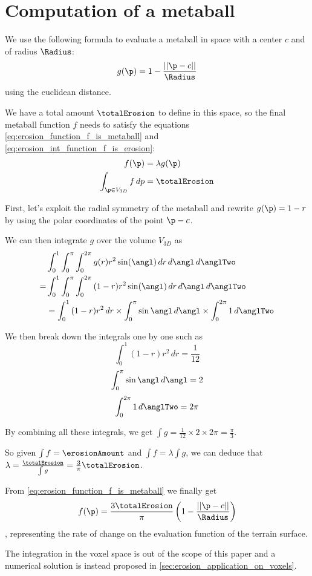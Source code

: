 \chapter{Computation of a metaball}
\label{sec:erosion_appendix_metaball}


We use the following formula to evaluate a metaball in space with a center $c$ and of radius $\Radius$:
$$ g(\p) = 1 - \frac{||\p - c||}{\Radius} $$
using the euclidean distance.

We have a total amount $\totalErosion$ to define in this space, so the final metaball function $f$ needs to satisfy the equations \eqref{eq:erosion_function_f_is_metaball} and \eqref{eq:erosion_int_function_f_is_erosion}:
\begin{align}
\label{eq:erosion_function_f_is_metaball}
f(\p) &= \lambda g(\p) \\
\label{eq:erosion_int_function_f_is_erosion}
\int_{\p \in V_{3D}}{f \, dp} &= \totalErosion
\end{align}

First, let's exploit the radial symmetry of the metaball and rewrite $g(\p) = 1 - r$ by using the polar coordinates of the point $\p - c$.

We can then integrate $g$ over the volume $V_{3D}$ as 
\begin{align}
&\int_{0}^{1}{ \int_{0}^{\pi}{ \int_{0}^{2\pi}{ g(r) r^2 \sin(\angl)\, dr} \, d\angl} \, d\anglTwo} \nonumber \\
= &\int_{0}^{1}{ \int_{0}^{\pi}{ \int_{0}^{2\pi}{ (1 - r) r^2 \sin(\angl)\, dr} \, d\angl} \, d\anglTwo} \nonumber \\
&= \int_{0}^{1}{ (1 - r)r^2 \, dr} \times \int_{0}^{\pi}{ \sin{\angl} \, d\angl } \times \int_{0}^{2\pi}{ 1 \, d\anglTwo} \nonumber
\end{align}

We then break down the integrals one by one such as 
$$ \int_{0}^{1}{ (1 - r)r^2 \, dr} = \frac{1}{12} \nonumber$$ 
$$ \int_{0}^{\pi}{ \sin{\angl} \, d\angl } = 2 \nonumber$$ 
$$ \int_{0}^{2\pi}{ 1 \, d\anglTwo} = 2 \pi \nonumber$$

By combining all these integrals, we get $\int{g} = \frac{1}{12} \times 2 \times 2\pi = \frac{\pi}{3}$.

So given $\int{f} = \erosionAmount$ and $\int{f} = \lambda \int{g}$, we can deduce that $\lambda = \frac{\totalErosion}{\int{g}} = \frac{3}{\pi}\totalErosion$.

From \eqref{eq:erosion_function_f_is_metaball} we finally get 
\begin{align} 
\label{eq:erosion_proofErosionMetaball}
f(\p) = \frac{3 \totalErosion}{\pi} \left(1 - \frac{||\p - c||}{\Radius} \right)
\end{align}
, representing the rate of change on the evaluation function of the terrain surface.

The integration in the voxel space is out of the scope of this paper and a numerical solution is instead proposed in \cref{sec:erosion_application_on_voxels}.